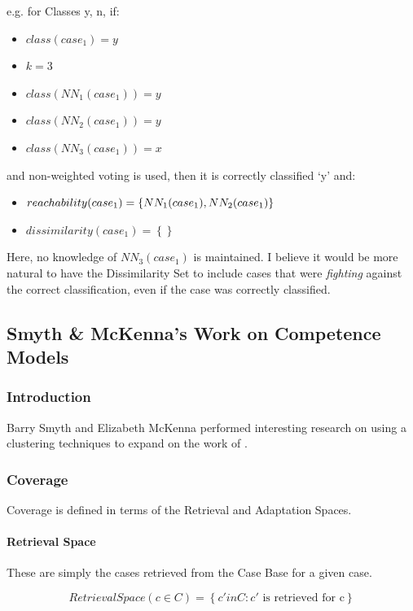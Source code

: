 \documentclass[a4paper,11pt]{report}
\begin{document}
e.g. for Classes {y, n}, if:
\begin{itemize}
	\item $class(case_{1})=y$ 
	\item $k = 3$
	\item $class(NN_{1}(case_{1})) = y$ 
	\item $class(NN_{2}(case_{1})) = y$
	\item $class(NN_{3}(case_{1})) = x$  
\end{itemize}
and non-weighted voting is used, then it is correctly classified `y' and:
\begin{itemize}
	\item $reachability(case_{1})=\left\{ NN_{1}(case_{1}),\hphantom{}NN_{2}(case_{1})\right\} $
	\item $dissimilarity(case_{1})=\left\{ \right\} $
\end{itemize}

Here, no knowledge of $NN_{3}(case_{1})$ is maintained. I believe it would be more natural to have the Dissimilarity Set to include cases that were \emph{fighting} against the correct classification, even if the case was correctly classified.

\subsection{Smyth \& McKenna's Work on Competence Models}
\subsubsection{Introduction}
Barry Smyth and Elizabeth McKenna performed interesting research on using a clustering techniques to expand on the work of \citet{Smyth1995} \cite{Smyth1998}.

\subsubsection{Coverage}
Coverage is defined in terms of the Retrieval and Adaptation Spaces.

\paragraph{Retrieval Space}

These are simply the cases retrieved from the Case Base for a given case.

\[ RetrievalSpace(c \in C) = \left\{ c' in C : c' \text{ is retrieved for c} \right\} \]
\end{document}

